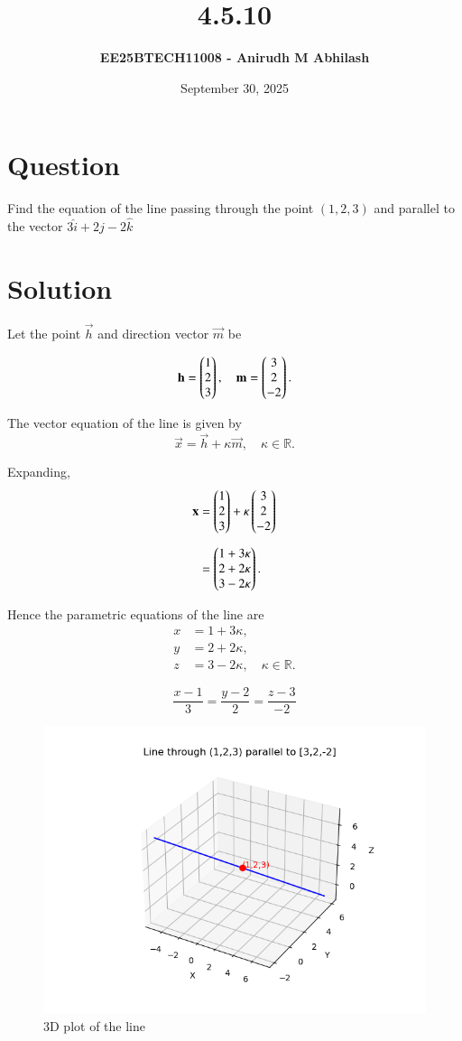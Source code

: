 \documentclass[12pt]{article}
\title{\textbf{4.5.10}}
\author{\textbf{EE25BTECH11008 - Anirudh M Abhilash}}
\date{September 30, 2025}
\begin{document}
\maketitle

\section*{Question}

Find the equation of the line passing through the point $(1,2,3)$ and parallel to the vector $3\hat{i} + 2\hat{j} - 2\hat{k}$

\section*{Solution}

Let the point $\vec{h}$ and direction vector $\vec{m}$ be  

\[
\mathbf{h} = \begin{pmatrix}1 \\ 2 \\ 3\end{pmatrix}, \quad 
\mathbf{m} = \begin{pmatrix}3 \\ 2 \\ -2\end{pmatrix}.
\]

The vector equation of the line is given by
\[
\vec{x} = \vec{h} + \kappa \vec{m}, \quad \kappa \in \mathbb{R}.
\]

Expanding,  
\begin{align}
\mathbf{x} &= \begin{pmatrix}1 \\ 2 \\ 3\end{pmatrix} + \kappa \begin{pmatrix}3 \\ 2 \\ -2\end{pmatrix} \\[2mm]
           &= \begin{pmatrix}1 + 3\kappa \\ 2 + 2\kappa \\ 3 - 2\kappa\end{pmatrix}.
\end{align}

Hence the parametric equations of the line are  
\begin{align}
x &= 1 + 3\kappa, \\ 
y &= 2 + 2\kappa, \\ 
z &= 3 - 2\kappa, \quad \kappa \in \mathbb{R}.
\end{align}

\[
\boxed{\frac{x - 1}{3} = \frac{y - 2}{2} = \frac{z - 3}{-2}}
\]

\begin{figure}[H]\centering
\includegraphics[width=1\columnwidth]{figs/plt.png}
\caption{3D plot of the line}
\label{fig:plt}
\end{figure}
\end{document}
